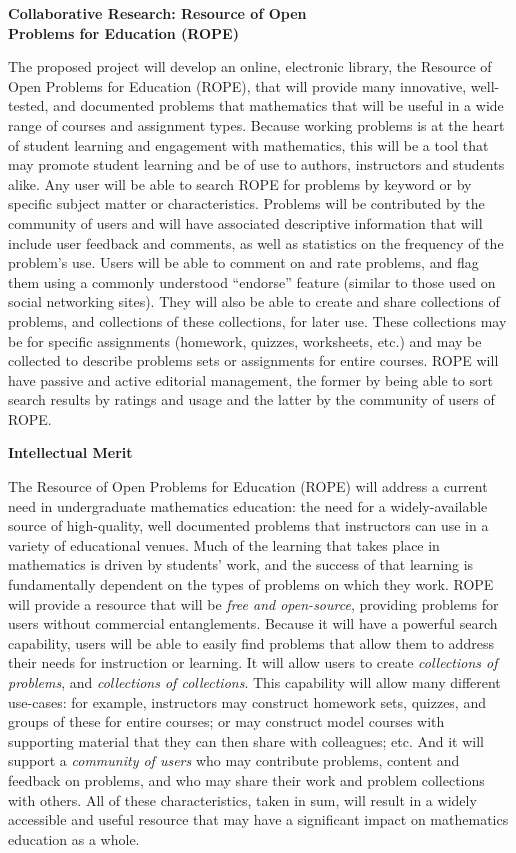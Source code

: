 \documentclass[11pt]{article}
\begin{document}
\begin{center}
{\Large \textbf{Collaborative Research: Resource of Open\\
Problems for Education (ROPE)}}
\end{center}

\bigskip
\noindent
The proposed project will develop an online, electronic library, the
Resource of Open Problems for Education (ROPE), that will provide many
innovative, well-tested, and documented problems that mathematics that
will be useful in a wide range of courses and assignment types.  Because
working problems is at the heart of student learning and engagement with
mathematics, this will be a tool that may promote student learning and be
of use to authors, instructors and students alike.  Any user will be able
to search ROPE for problems by keyword or by specific subject matter or
characteristics.  Problems will be contributed by the community of users
and will have associated descriptive information that will include user
feedback and comments, as well as statistics on the frequency of the
problem's use.  Users will be able to comment on and rate problems, and
flag them using a commonly understood ``endorse'' feature (similar to
those used on social networking sites).  They will also be able to create
and share collections of problems, and collections of these collections,
for later use.  These collections may be for specific assignments
(homework, quizzes, worksheets, etc.) and may be collected to describe
problems sets or assignments for entire courses.  ROPE will have passive
and active editorial management, the former by being able to sort search
results by ratings and usage and the latter by the community of users of
ROPE.

\bigskip\bigskip
\noindent
{\large \textbf{Intellectual Merit}}

The Resource of Open Problems for Education (ROPE) will address a current
need in undergraduate mathematics education: the need for a
widely-available source of high-quality, well documented problems that
instructors can use in a variety of educational venues.  Much of the
learning that takes place in mathematics is driven by students' work, and
the success of that learning is fundamentally dependent on the types of
problems on which they work.  ROPE will provide a resource that will be
\emph{free and open-source}, providing problems for users without
commercial entanglements.  Because it will have a powerful search
capability, users will be able to easily find problems that allow them to
address their needs for instruction or learning.  It will allow users to
create \emph{collections of problems}, and \emph{collections of
collections}.  This capability will allow many different use-cases: for
example, instructors may construct homework sets, quizzes, and groups of
these for entire courses; or may construct model courses with supporting
material that they can then share with colleagues; etc.  And it will
support a \emph{community of users} who may contribute problems, content
and feedback on problems, and who may share their work and problem
collections with others.  All of these characteristics, taken in sum, will
result in a widely accessible and useful resource that may have a
significant impact on mathematics education as a whole.
\end{document}
